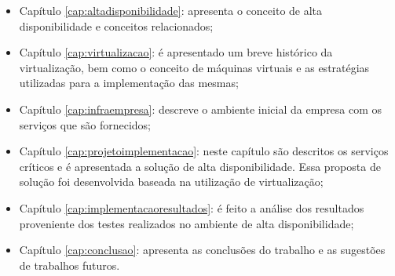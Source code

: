 \begin{itemize}
 \item Capítulo \ref{cap:altadisponibilidade}: apresenta o conceito de alta disponibilidade e conceitos relacionados;
 \item Capítulo \ref{cap:virtualizacao}: é apresentado um breve histórico da virtualização, bem como o conceito de máquinas virtuais e as 
 estratégias utilizadas para a implementação das mesmas;
 \item Capítulo \ref{cap:infraempresa}: descreve o ambiente inicial da empresa com os serviços que são fornecidos;
 \item Capítulo \ref{cap:projetoimplementacao}: neste capítulo são descritos os serviços críticos e é apresentada a solução de alta disponibilidade. 
 Essa proposta de solução foi desenvolvida baseada na utilização de virtualização;
 \item Capítulo \ref{cap:implementacaoresultados}: é feito a análise dos resultados proveniente dos testes realizados no ambiente de alta 
 disponibilidade;
 \item Capítulo \ref{cap:conclusao}: apresenta as conclusões do trabalho e as sugestões de trabalhos futuros.
\end{itemize}
